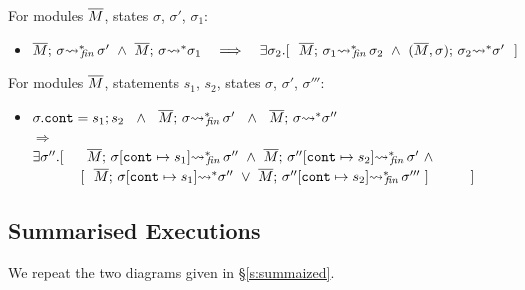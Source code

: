  \begin{auxLemma}
 \label{lemma:encl:tem}
 For   modules $\overline{M}$,   states $\sigma$, $\sigma'$, $\sigma_1$:
\begin{itemize}
\item
$  \leadstoBoundedStarFin {\Mtwo}  {\sigma}  {\sigma'} \  \wedge \  \leadstoBoundedStar  {\Mtwo}  {\sigma}  {\sigma_1} 
\ \ \  \Longrightarrow\ \ \  %
 \exists \sigma_2.[\ \ \leadstoBoundedStarFin {\Mtwo} {\sigma_1}  {\sigma_2}  
\ \wedge\ 
\leadstoBoundedStarThree  {\Mtwo}  {\sigma_2}  {\sigma}   {\sigma'} \ \ ]$
\end{itemize}

\end{auxLemma} 

\begin{auxLemma}
\label{lemma:subexp}
For modules $\overline{M}$, statements $s_1$, $s_2$,  states $\sigma$, $\sigma'$, $\sigma'''$:
\begin{itemize}
\item
$ \sigma.\texttt{cont} = s_1; s_2 \ \ \wedge\ \  \leadstoBoundedStarFin {\Mtwo}  {\sigma}  {\sigma'}\ \ 
\wedge \ \
\leadstoBoundedStar {\Mtwo}  {\sigma}  {\sigma''}\
$\\
$  \Longrightarrow$\\
$   \exists \sigma''.[\ \ \ \ \   \leadstoBoundedStarFin {\Mtwo} {\sigma[\texttt{cont}\mapsto s_1]}  {\sigma''}  
\ \wedge\ 
\leadstoBoundedStarFin {\Mtwo} {\sigma''[\texttt{cont}\mapsto s_2]}   {\sigma'} \  \wedge$
\\
$\strut \hspace{1.2cm}  [ \ \ \overline{M};\, {\sigma[\texttt{cont}\mapsto s_1]} {\rightsquigarrow^*} \sigma''\ \vee \ \overline{M};\, {\sigma''[\texttt{cont}\mapsto s_2]} {\rightsquigarrow^*}\!\!_{\mathit{fin}}\, \sigma'''\ ]\ \ \ \ \ \ \ \  \ ] $
\end{itemize}
\end{auxLemma}

\subsection{Summarised Executions}

We repeat the two diagrams given in \S \ref{s:summaized}.

